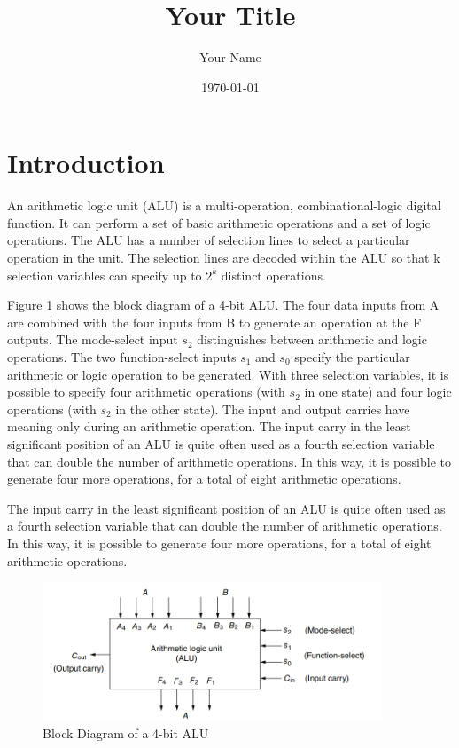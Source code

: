 \documentclass[11pt]{article}
\title{Your Title}
\author{Your Name}
\date{\today}
\begin{document}
\maketitle
\pagebreak

\section{Introduction}
An arithmetic logic unit (ALU) is a multi-operation, combinational-logic digital function. It can 
perform a set of basic arithmetic operations and a set of logic operations. The ALU has a number of selection lines to select a particular operation in the unit. The selection lines are decoded 
within the ALU so that k selection variables can specify up to $2^k$
distinct operations.


Figure 1 shows the block diagram of a 4-bit ALU. The four data inputs from A are combined with the four inputs from B to generate an operation at the F outputs. The mode-select 
input $s_2$ distinguishes between arithmetic and logic operations. The two function-select inputs $s_1$
and $s_0$ specify the particular arithmetic or logic operation to be generated. With three selection 
variables, it is possible to specify four arithmetic operations (with $s_2$ in one state) and four logic 
operations (with $s_2$ in the other state). The input and output carries have meaning only during an 
arithmetic operation.
The input carry in the least significant position of an ALU is quite often used as a fourth 
selection variable that can double the number of arithmetic operations. In this way, it is possible 
to generate four more operations, for a total of eight arithmetic operations.

The input carry in the least significant position of an ALU is quite often used as a fourth 
selection variable that can double the number of arithmetic operations. In this way, it is possible 
to generate four more operations, for a total of eight arithmetic operations.

\begin{figure}[ht]
\centering
\includegraphics[width=0.9\textwidth]{images/ALU.png}
\caption{Block Diagram of a 4-bit ALU}
\end{figure}
\end{document}
